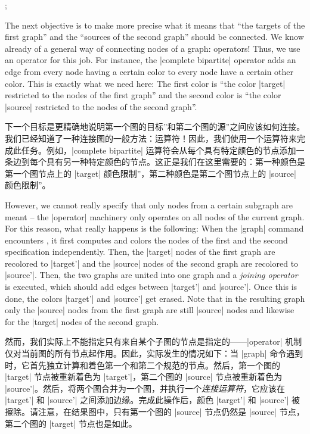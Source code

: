 %
\begin{codeexample}[preamble={\usetikzlibrary{graphs}}]
\def\hilightsource#1{\fill [green, opacity=.25] (#1) circle [radius=2mm]; }
\def\hilighttarget#1{\fill [red,   opacity=.25] (#1) circle [radius=2mm]; }
\tikz {};
\end{codeexample}

The next objective is to make more precise what it means that ``the targets of
the first graph'' and the ``sources of the second graph'' should be connected.
We know already of a general way of connecting nodes of a graph: operators!
Thus, we use an operator for this job. For instance, the |complete bipartite|
operator adds an edge from every node having a certain color to every node have
a certain other color. This is exactly what we need here: The first color is
``the color |target| restricted to the nodes of the first graph'' and the
second color is ``the color |source| restricted to the nodes of the second
graph''.

下一个目标是更精确地说明第一个图的目标''和第二个图的源''之间应该如何连接。我们已经知道了一种连接图的一般方法：运算符！因此，我们使用一个运算符来完成此任务。例如，|complete bipartite| 运算符会从每个具有特定颜色的节点添加一条边到每个具有另一种特定颜色的节点。这正是我们在这里需要的：第一种颜色是第一个图节点上的 |target| 颜色限制''，第二种颜色是第二个图节点上的 |source| 颜色限制''。

However, we cannot really specify that only nodes from a certain subgraph are
meant -- the |operator| machinery only operates on all nodes of the current
graph. For this reason, what really happens is the following: When the |graph|
command encounters   ,
it first computes and colors the nodes of the first and the second
specification independently. Then, the |target| nodes of the first graph are
recolored to |target'| and the |source| nodes of the second graph are recolored
to |source'|. Then, the two graphs are united into one graph and a
\emph{joining operator} is executed, which should add edges between |target'|
and |source'|. Once this is done, the colors |target'| and |source'| get
erased. Note that in the resulting graph only the |source| nodes from the first
graph are still |source| nodes and likewise for the |target| nodes of the
second graph.

然而，我们实际上不能指定只有来自某个子图的节点是指定的——|operator| 机制仅对当前图的所有节点起作用。因此，实际发生的情况如下：当 |graph| 命令遇到    时，它首先独立计算和着色第一个和第二个规范的节点。然后，第一个图的 |target| 节点被重新着色为 |target'|，第二个图的 |source| 节点被重新着色为 |source'|。然后，将两个图合并为一个图，并执行一个\emph{连接运算符}，它应该在 |target'| 和 |source'| 之间添加边缘。完成此操作后，颜色 |target'| 和 |source'| 被擦除。请注意，在结果图中，只有第一个图的 |source| 节点仍然是 |source| 节点，第二个图的 |target| 节点也是如此。

